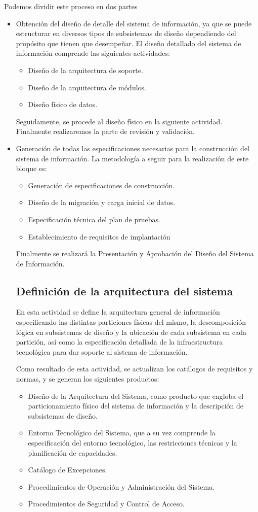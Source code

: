 \documentclass[11pt,a4paper,spanish,twoside]{report}
\begin{document}
Podemos dividir este proceso en dos partes
\begin{itemize}
\item Obtención del diseño de detalle del sistema de información, ya que se
  puede estructurar en diversos tipos de subsistemas de diseño dependiendo
  del propósito que tienen que desempeñar. El diseño detallado del sistema de
  información comprende las siguientes actividades: 
  \begin{itemize}
  \item Diseño de la arquitectura de soporte.
  \item Diseño de la arquitectura de módulos.
  \item Diseño físico de datos.
  \end{itemize}
  Seguidamente, se procede al diseño físico en la siguiente
  actividad. Finalmente realizaremos la parte de revisión y validación.

\item Generación de todas las especificaciones necesarias para la
  construcción del sistema de información. La metodología a seguir para la
  realización de este bloque es:
  \begin{itemize}
  \item Generación de especificaciones de construcción.
  \item Diseño de la migración y carga inicial de datos.
  \item Especificación técnica del plan de pruebas.
  \item Establecimiento de requisitos de implantación
  \end{itemize}
  Finalmente se realizará la Presentación y Aprobación del Diseño del Sistema
  de Información.

\subsection{Definición de la arquitectura del sistema}
En esta actividad se define la arquitectura general de información
especificando las distintas particiones físicas del mismo, la descomposición
lógica en subsistemas de diseño y la ubicación de cada subsistema en cada
partición, así como la especificación detallada de la infraestructura
tecnológica para dar soporte al sistema de información.

Como resultado de esta actividad, se actualizan los catálogos de requisitos y
normas, y se generan los siguientes productos:
\begin{itemize}
\item Diseño de la Arquitectura del Sistema, como producto que engloba el
  particionamiento físico del sistema de información y la descripción de
  subsistemas de diseño.
\item Entorno Tecnológico del Sistema, que a su vez comprende la
  especificación del entorno tecnológico, las restricciones técnicas y la
  planificación de capacidades.
\item Catálogo de Excepciones.
\item Procedimientos de Operación y Administración del Sistema.
\item Procedimientos de Seguridad y Control de Acceso.
\end{itemize}


\end{itemize}
\end{document}
